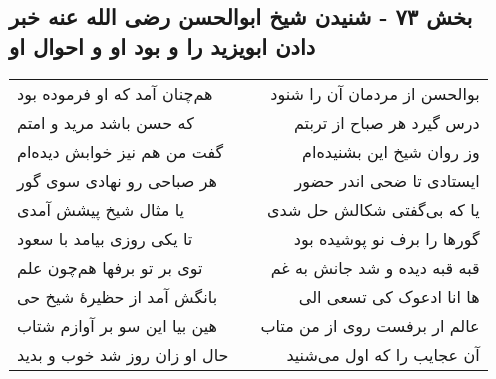 \begin{center}
\section*{بخش ۷۳ - شنیدن شیخ ابوالحسن رضی الله عنه خبر دادن ابویزید را و  بود او و احوال او}
\label{sec:sh073}
\begin{longtable}{l p{0.5cm} r}
هم‌چنان آمد که او فرموده بود
&&
بوالحسن از مردمان آن را شنود
\\
که حسن باشد مرید و امتم
&&
درس گیرد هر صباح از تربتم
\\
گفت من هم نیز خوابش دیده‌ام
&&
وز روان شیخ این بشنیده‌ام
\\
هر صباحی رو نهادی سوی گور
&&
ایستادی تا ضحی اندر حضور
\\
یا مثال شیخ پیشش آمدی
&&
یا که بی‌گفتی شکالش حل شدی
\\
تا یکی روزی بیامد با سعود
&&
گورها را برف نو پوشیده بود
\\
توی بر تو برفها هم‌چون علم
&&
قبه قبه دیده و شد جانش به غم
\\
بانگش آمد از حظیرهٔ شیخ حی
&&
ها انا ادعوک کی تسعی الی
\\
هین بیا این سو بر آوازم شتاب
&&
عالم ار برفست روی از من متاب
\\
حال او زان روز شد خوب و بدید
&&
آن عجایب را که اول می‌شنید
\\
\end{longtable}
\end{center}
